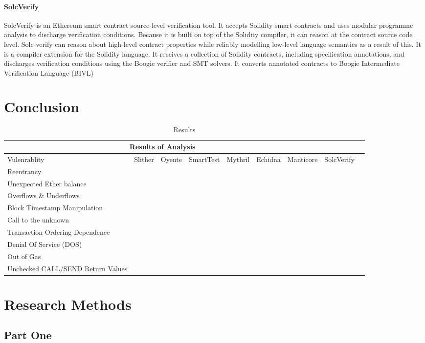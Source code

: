 \documentclass[a4paper,sigconf, language=french,
language=german, language=spanish, language=english]{acmart}
\begin{document}
\paragraph{SolcVerify} SolcVerify is an Ethereum smart contract source-level verification tool.
It accepts Solidity smart contracts and uses modular programme analysis to discharge verification conditions.
Because it is built on top of the Solidity compiler, it can reason at the contract source code level.
Solc-verify can reason about high-level contract properties while reliably modelling low-level language semantics as a result of this.
It is a compiler extension for the Solidity language.
It receives a collection of Solidity contracts, including specification annotations, and discharges verification conditions using the Boogie verifier and SMT solvers.
It converts annotated contracts to Boogie Intermediate Verification Language (BIVL)
 
\section{Conclusion}
\label{Conclusion}

\begin{table*}
  \caption{Results}
  \label{Results}
  \begin{tabular}{ |p{2cm}||p{1cm}|p{2cm}| p{2cm} |p{1cm}|p{2cm}|p{2cm}| p{1cm}|p{2cm}}
  \hline
  \multicolumn{7}{|c|}{Results of Analysis} \\
  \hline
  Vulenrablity & Slither & Oyente & SmartTest & Mythril & Echidna & Manticore & SolcVerify \\
  \hline
  Reentrancy & &&&&&&\\
  \hline
  Unexpected Ether balance && &&&&& \\
  \hline
  Overflows \& Underflows & &&&&&& \\
  \hline
  Block Timestamp Manipulation && &&&&& \\
  \hline
  Call to the unknown & &&&&&&\\
  \hline
  Transaction Ordering Dependence & &&&&&& \\
  \hline
  Denial Of Service (DOS) & &&&&&&\\
  \hline
  Out of Gas & &&&&&& \\
  \hline
  Unchecked CALL/SEND Return Values& &&&&&&\\
  \hline
  \end{tabular}
\end{table*}
\begin{acks}

\end{acks}




\appendix

\section{Research Methods}

\subsection{Part One}
\end{document}
